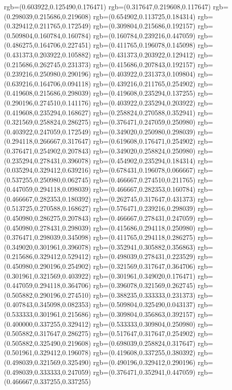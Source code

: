 {{rgb=(0.603922,0.125490,0.176471)
rgb=(0.317647,0.219608,0.117647)
rgb=(0.298039,0.215686,0.219608)
rgb=(0.654902,0.113725,0.184314)
rgb=(0.329412,0.211765,0.172549)
rgb=(0.309804,0.215686,0.192157)
rgb=(0.509804,0.160784,0.160784)
rgb=(0.160784,0.239216,0.447059)
rgb=(0.486275,0.164706,0.227451)
rgb=(0.411765,0.196078,0.145098)
rgb=(0.431373,0.203922,0.105882)
rgb=(0.431373,0.203922,0.129412)
rgb=(0.215686,0.262745,0.231373)
rgb=(0.415686,0.207843,0.192157)
rgb=(0.239216,0.250980,0.290196)
rgb=(0.403922,0.231373,0.109804)
rgb=(0.639216,0.164706,0.094118)
rgb=(0.439216,0.211765,0.254902)
rgb=(0.419608,0.215686,0.298039)
rgb=(0.419608,0.235294,0.137255)
rgb=(0.290196,0.274510,0.141176)
rgb=(0.403922,0.235294,0.203922)
rgb=(0.419608,0.235294,0.168627)
rgb=(0.258824,0.270588,0.352941)
rgb=(0.321569,0.258824,0.286275)
rgb=(0.376471,0.247059,0.250980)
rgb=(0.403922,0.247059,0.172549)
rgb=(0.349020,0.250980,0.298039)
rgb=(0.294118,0.266667,0.317647)
rgb=(0.619608,0.176471,0.254902)
rgb=(0.376471,0.254902,0.207843)
rgb=(0.349020,0.258824,0.250980)
rgb=(0.235294,0.278431,0.396078)
rgb=(0.454902,0.235294,0.184314)
rgb=(0.035294,0.329412,0.639216)
rgb=(0.678431,0.196078,0.066667)
rgb=(0.537255,0.250980,0.062745)
rgb=(0.466667,0.274510,0.211765)
rgb=(0.447059,0.294118,0.098039)
rgb=(0.466667,0.282353,0.160784)
rgb=(0.466667,0.282353,0.180392)
rgb=(0.262745,0.317647,0.431373)
rgb=(0.513725,0.270588,0.168627)
rgb=(0.576471,0.239216,0.298039)
rgb=(0.450980,0.286275,0.207843)
rgb=(0.466667,0.278431,0.247059)
rgb=(0.450980,0.278431,0.298039)
rgb=(0.415686,0.294118,0.250980)
rgb=(0.376471,0.298039,0.345098)
rgb=(0.411765,0.294118,0.286275)
rgb=(0.349020,0.301961,0.396078)
rgb=(0.352941,0.305882,0.356863)
rgb=(0.215686,0.329412,0.529412)
rgb=(0.498039,0.278431,0.223529)
rgb=(0.450980,0.290196,0.254902)
rgb=(0.321569,0.317647,0.364706)
rgb=(0.301961,0.321569,0.403922)
rgb=(0.301961,0.349020,0.176471)
rgb=(0.447059,0.294118,0.364706)
rgb=(0.396078,0.321569,0.262745)
rgb=(0.505882,0.290196,0.274510)
rgb=(0.388235,0.333333,0.231373)
rgb=(0.407843,0.345098,0.082353)
rgb=(0.509804,0.325490,0.043137)
rgb=(0.533333,0.301961,0.215686)
rgb=(0.309804,0.356863,0.392157)
rgb=(0.400000,0.337255,0.329412)
rgb=(0.533333,0.309804,0.250980)
rgb=(0.505882,0.317647,0.286275)
rgb=(0.517647,0.317647,0.254902)
rgb=(0.505882,0.325490,0.219608)
rgb=(0.698039,0.258824,0.317647)
rgb=(0.501961,0.329412,0.196078)
rgb=(0.419608,0.337255,0.380392)
rgb=(0.498039,0.321569,0.325490)
rgb=(0.490196,0.329412,0.290196)
rgb=(0.498039,0.333333,0.247059)
rgb=(0.376471,0.352941,0.447059)
rgb=(0.466667,0.337255,0.337255)
}}
